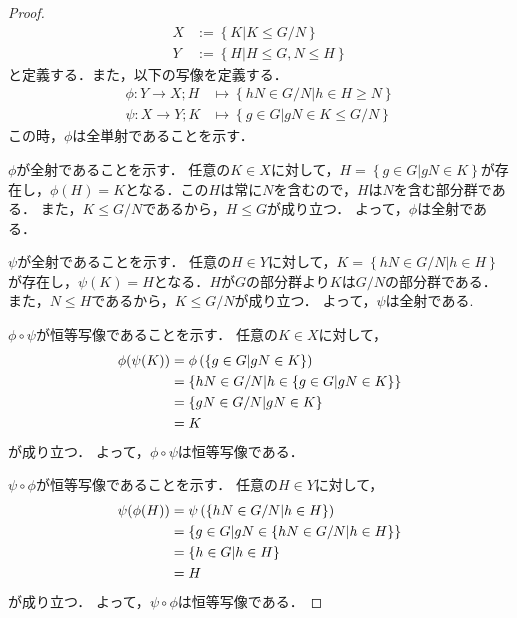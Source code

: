 \begin{proof}

    \begin{align}
        X&:=\left\{ K | K \leq  G/N\right\} \\
        Y&:=\left\{ H | H\leq  G , N \leq   H \right\}
    \end{align}
    と定義する．また，以下の写像を定義する．
    \begin{align}
        \phi : Y \to X;H &\mapsto \left\{hN \in G/N | h \in H \geq  N\right\} \\
        \psi : X \to Y;K &\mapsto \left\{g\in G | gN \in K \leq  G/N \right\}
    \end{align}
    この時，$\phi$は全単射であることを示す．

    $\phi$が全射であることを示す．
    任意の$K\in X$に対して，$H=\left\{g\in G | gN \in K\right\}$が存在し，$\phi(H)=K$となる．この$H$は常に$N$を含むので，$H$は$N$を含む部分群である．
    また，$K\leq G/N$であるから，$H\leq G$が成り立つ．
    よって，$\phi$は全射である．

    $\psi$が全射であることを示す．
    任意の$H\in Y$に対して，$K=\left\{hN \in G/N | h \in H\right\}$が存在し，$\psi(K)=H$となる．$H$が$G$の部分群より$K$は$G/N$の部分群である．
    また，$N\leq H$であるから，$K\leq G/N$が成り立つ．
    よって，$\psi$は全射である.

    $\phi\circ\psi$が恒等写像であることを示す．
    任意の$K\in X$に対して，
    \begin{align}
        \phi(\psi(K)) &= \phi\left(\left\{g\in G | gN \in K\right\}\right) \notag\\
        &= \left\{hN \in G/N | h \in \left\{g\in G | gN \in K\right\}\right\} \notag\\
        &= \left\{gN \in G/N | gN \in K\right\} \notag\\
        &= K \notag
    \end{align}
    が成り立つ．
    よって，$\phi\circ\psi$は恒等写像である．

    $\psi\circ\phi$が恒等写像であることを示す．
    任意の$H\in Y$に対して，
    \begin{align}
        \psi(\phi(H)) &= \psi\left(\left\{hN \in G/N | h \in H\right\}\right) \notag\\
        &= \left\{g\in G | gN \in \left\{hN \in G/N | h \in H\right\}\right\} \notag\\
        &= \left\{h \in G | h \in H\right\} \notag\\
        &= H \notag
    \end{align}
    が成り立つ．
    よって，$\psi\circ\phi$は恒等写像である．


\end{proof}

